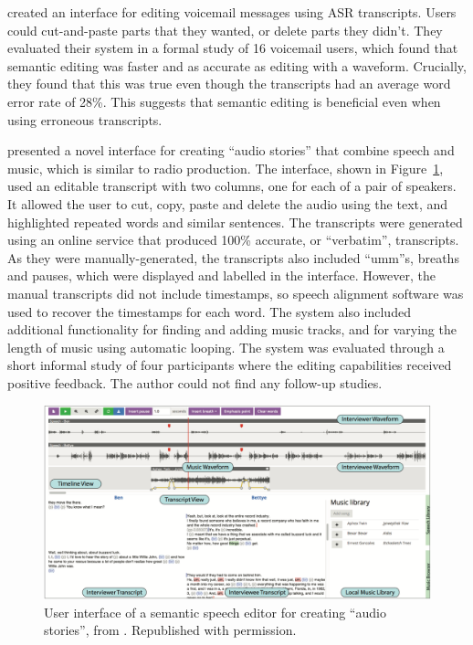 \citet{Whittaker2004} created an interface for editing voicemail messages using ASR transcripts.  Users could
cut-and-paste parts that they wanted, or delete parts they didn't.  They evaluated their system in a formal study of 16
voicemail users, which found that semantic editing was faster and as accurate as editing with a waveform.
Crucially, they found that this was true even though the transcripts had an average word
error rate of 28\%. This suggests that semantic editing is beneficial even when using erroneous transcripts.

\citet{Rubin2013,Rubin2015} presented a novel interface for creating ``audio stories'' that combine speech and music,
which is similar to radio production.  The interface, shown in Figure~\ref{fig:Rubin2013}, used an editable transcript
with two columns, one for each of a pair of speakers.  It allowed the user to cut, copy, paste and delete the audio
using the text, and highlighted repeated words and similar sentences.  The transcripts were generated using an online
service that produced 100\% accurate, or ``verbatim'', transcripts.  As they were manually-generated, the transcripts
also included ``umm''s, breaths and pauses, which were displayed and labelled in the interface. However, the manual
transcripts did not include timestamps, so speech alignment software was used to recover the timestamps for each word.
The system also included additional functionality for finding and adding music tracks, and for varying the length of
music using automatic looping. The system was evaluated through a short informal study of four participants where the
editing capabilities received positive feedback. The author could not find any follow-up studies.

\begin{figure}[h]
\centering
  \centering
  \includegraphics[width=\textwidth]{figs/Rubin2013.png}
  \caption{User interface of a semantic speech editor for creating ``audio stories'', from \citet{Rubin2013}.
  Republished with permission.}
  \label{fig:Rubin2013}
\end{figure}


